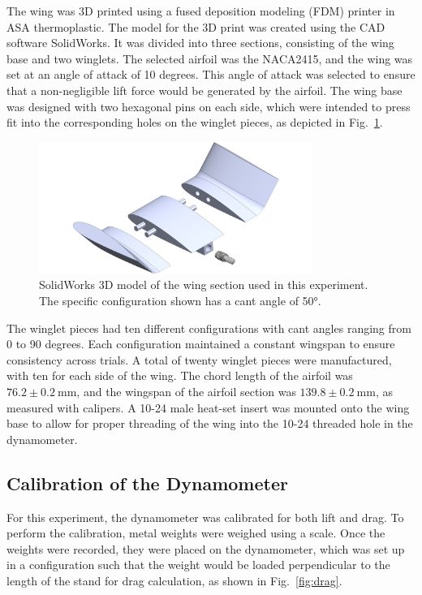 \documentclass[journal,letterpaper]{IEEEtran}
\begin{document}
The wing was 3D printed using a fused deposition modeling (FDM) printer in ASA thermoplastic.
The model for the 3D print was created using the CAD software SolidWorks.
It was divided into three sections, consisting of the wing base and two winglets.
The selected airfoil was the NACA2415, and the wing was set at an angle of attack of 10 degrees.
This angle of attack was selected to ensure that a non-negligible lift force would be generated by the airfoil.
The wing base was designed with two hexagonal pins on each side, which were intended to press fit into the corresponding holes on the winglet pieces, as depicted in Fig.~\ref{fig:Airfoil}.

\begin{figure}[H]
    \centering
    \includegraphics[width=3.5in]{Airfoil}
    \caption{SolidWorks 3D model of the wing section used in this experiment. The specific configuration shown has a cant angle of \ang{50}.}
    \label{fig:Airfoil}
\end{figure}

The winglet pieces had ten different configurations with cant angles ranging from 0 to 90 degrees.
Each configuration maintained a constant wingspan to ensure consistency across trials.
A total of twenty winglet pieces were manufactured, with ten for each side of the wing.
The chord length of the airfoil was $76.2 \pm \qty{0.2}{\mm}$, and the wingspan of the airfoil section was $139.8 \pm \qty{0.2}{\mm}$, as measured with calipers.
A 10-24 male heat-set insert was mounted onto the wing base to allow for proper threading of the wing into the 10-24 threaded hole in the dynamometer.

\subsection{Calibration of the Dynamometer}

For this experiment, the dynamometer was calibrated for both lift and drag.
To perform the calibration, metal weights were weighed using a scale.
Once the weights were recorded, they were placed on the dynamometer, which was set up in a configuration such that the weight would be loaded perpendicular to the length of the stand for drag calculation, as shown in Fig.~\ref{fig:drag}.
\end{document}
